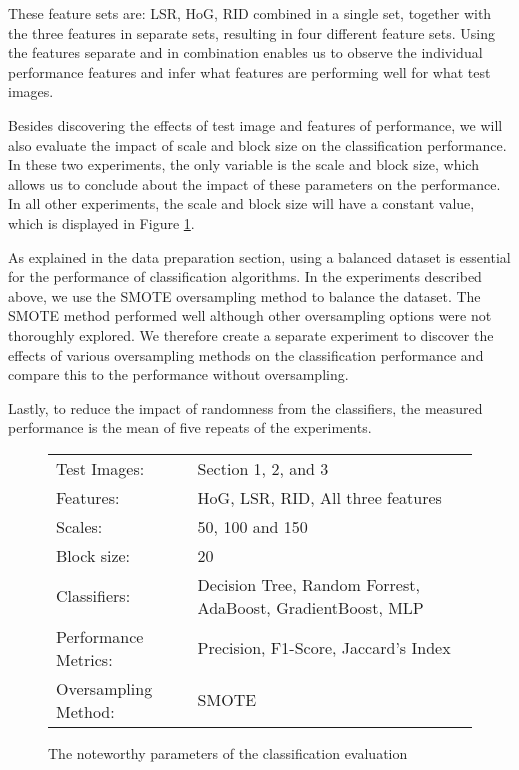 These feature sets are: LSR, HoG, RID combined in a single set, together with the three features in separate sets, resulting in four different feature sets. Using the features separate and in combination enables us to observe the individual performance features and infer what features are performing well for what test images.

Besides discovering the effects of test image and features of performance, we will also evaluate the impact of scale and block size on the classification performance. In these two experiments, the only variable is the scale and block size, which allows us to conclude about the impact of these parameters on the performance. In all other experiments, the scale and block size will have a constant value, which is displayed in Figure \ref{fig:params}.


As explained in the data preparation section, using a balanced dataset is essential for the performance of classification algorithms. In the experiments described above, we use the SMOTE oversampling method to balance the dataset. The SMOTE method performed well although other oversampling options were not thoroughly explored. We therefore create a separate experiment to discover the effects of various oversampling methods on the classification performance and compare this to the performance without oversampling. 

Lastly, to reduce the impact of randomness from the classifiers, the measured performance is the mean of five repeats of the experiments.

\begin{figure}
	\centering
	\begin{tabular}{|ll|}
		\hline
		Test Images: & Section 1, 2, and 3 \\
		Features: & HoG, LSR, RID, All three features\\
		Scales: & 50, 100 and 150 \\
		Block size: & 20\\
		Classifiers: & Decision Tree, Random Forrest, AdaBoost, GradientBoost, MLP \\
		Performance Metrics: & Precision, F1-Score, Jaccard's Index\\
		Oversampling Method: & SMOTE\\
		\hline
	\end{tabular}
	\caption{The noteworthy parameters of the classification evaluation}
	\label{fig:params}
\end{figure}

